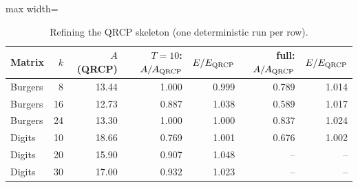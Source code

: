 \begin{table}[t]
\centering\small
\caption{Refining the QRCP skeleton (one deterministic run per row).}\label{tab:qrcp}
\begin{adjustbox}{max width=\linewidth}
\begin{tabular}{lrrrrrr}
\toprule
Matrix & $k$ & $A$ (QRCP) & $T{=}10$: $A/A_{\rm QRCP}$ & $E/E_{\rm QRCP}$ & full: $A/A_{\rm QRCP}$ & $E/E_{\rm QRCP}$ \\
\midrule
Burgers & 8 & 13.44 & 1.000 & 0.999 & 0.789 & 1.014 \\
Burgers & 16 & 12.73 & 0.887 & 1.038 & 0.589 & 1.017 \\
Burgers & 24 & 13.30 & 1.000 & 1.000 & 0.837 & 1.024 \\
Digits & 10 & 18.66 & 0.769 & 1.001 & 0.676 & 1.002 \\
Digits & 20 & 15.90 & 0.907 & 1.048 & -- & -- \\
Digits & 30 & 17.00 & 0.932 & 1.023 & -- & -- \\
\bottomrule
\end{tabular}
\end{adjustbox}
\end{table}
